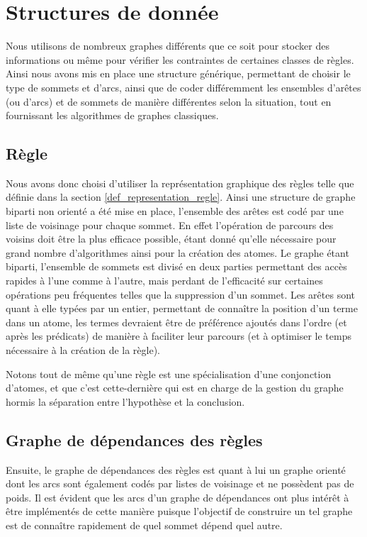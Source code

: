 
\section{Structures de donnée}\label{structures}
Nous utilisons de nombreux graphes différents que ce soit pour stocker des informations
ou même pour vérifier les contraintes de certaines classes de règles. Ainsi nous avons
mis en place une structure générique, permettant de choisir le type de sommets et d'arcs,
ainsi que de coder différemment les ensembles d'arêtes (ou d'arcs) et de sommets de
manière différentes selon la situation, tout en fournissant les algorithmes de graphes
classiques.

\subsection{Règle}
Nous avons donc choisi d'utiliser la représentation graphique des règles 
telle que définie dans la section \ref{def_representation_regle}.
Ainsi une structure de graphe biparti non orienté a été mise en place, l'ensemble des
arêtes est codé par une liste de voisinage pour chaque sommet.
En effet l'opération de parcours des voisins doit être la plus efficace possible, étant
donné qu'elle nécessaire pour grand nombre d'algorithmes ainsi pour la création des
atomes.
Le graphe étant biparti, l'ensemble de sommets est divisé en deux parties permettant des
accès rapides à l'une comme à l'autre, mais perdant de l'efficacité sur certaines
opérations peu fréquentes telles que la suppression d'un sommet.
Les arêtes sont quant à elle typées par un entier, permettant de connaître la position
d'un terme dans un atome, les termes devraient être de préférence ajoutés dans l'ordre
(et après les prédicats) de manière à faciliter leur parcours (et à optimiser le temps
nécessaire à la création de la règle).

Notons tout de même qu'une règle est une spécialisation d'une conjonction d'atomes, et
que c'est cette-dernière qui est en charge de la gestion du graphe hormis la séparation
entre l'hypothèse et la conclusion.

\subsection{Graphe de dépendances des règles}
Ensuite, le graphe de dépendances des règles est quant à lui un graphe orienté dont les
arcs sont également codés par listes de voisinage et ne possèdent pas de poids.
Il est évident que les arcs d'un graphe de
dépendances ont plus intérêt à être implémentés de cette manière puisque l'objectif de
construire un tel graphe est de connaître rapidement de quel sommet dépend quel autre.

